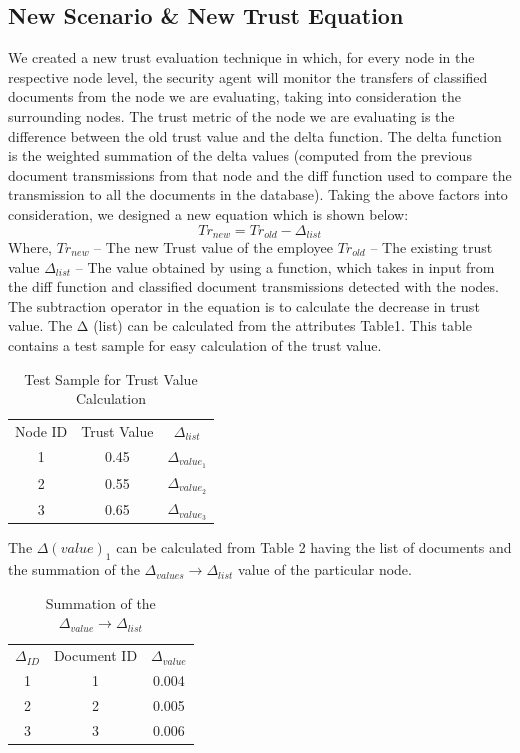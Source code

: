\subsection{New Scenario \& New Trust Equation}
We created a new trust evaluation technique in which, for every node in the respective node level, the security agent will monitor the transfers of classified documents from the node we are evaluating, taking into consideration the surrounding nodes. The trust metric of the node we are evaluating is the difference between the old trust value and the delta function. The delta function is the weighted summation of the delta values (computed from the previous document transmissions from that node and the diff function used to compare the transmission to all the documents in the database). 
Taking the above factors into consideration, we designed a new equation which is shown below:
\begin{equation}
    Tr_{new}=Tr_{old} - \Delta_{list}
\end{equation}
Where, \(Tr_{new}\) – The new Trust value of the employee
\(Tr_{old}\) – The existing trust value
\(\Delta_{list}\) – The value obtained by using a function, which takes in input from the diff function and classified document transmissions detected with the nodes.
The subtraction operator in the equation is to calculate the decrease in trust value.
The Δ (list) can be calculated from the attributes Table1. This table contains a test sample for easy calculation of the trust value.

\begin{table}[h!]
    \centering
    \begin{tabular}{c | c | c}
        Node ID & Trust Value & \(\Delta_{list}\) \\
        1 & 0.45 & \(\Delta_{value_1}\) \\
        2 & 0.55 & \(\Delta_{value_2}\) \\
        3 & 0.65 & \(\Delta_{value_3}\) \\
    \end{tabular}
    \caption{Test Sample for Trust Value Calculation}
    \label{tab:trust_value_calculation}
\end{table}

The \(\Delta(value)_1\) can be calculated from Table 2 having the list of
documents and the summation of the \(\Delta_{values} \to \Delta_{list} \) value of the particular node. 

\begin{table}[h!]
    \centering
    \begin{tabular}{c | c | c}
        \(\Delta_{ID} \) & Document ID & \(\Delta_{value}\) \\
        1 & 1 & 0.004 \\
        2 & 2 & 0.005 \\
        3 & 3 & 0.006 \\
    \end{tabular}
    \caption{Summation of the \(\Delta_{value} \to \Delta_{list}\)}
    \label{tab:summation_value_calculation}
\end{table}

